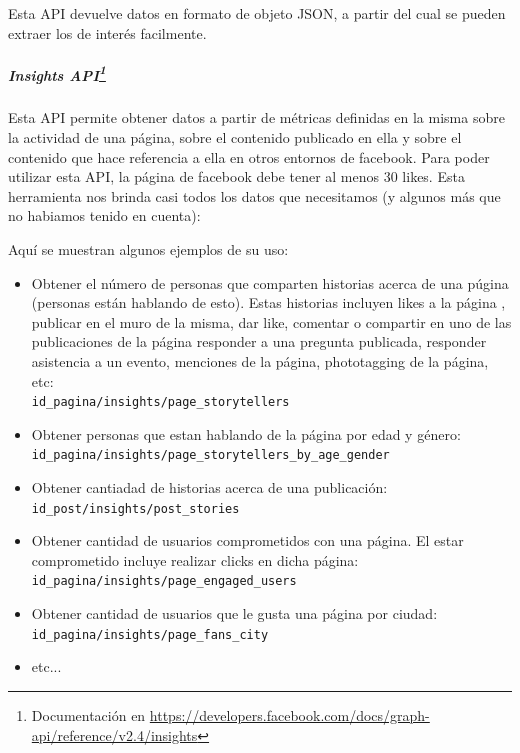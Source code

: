 \documentclass[oneside]{book}
\begin{document}
	Esta API devuelve datos en formato de objeto JSON, a partir del cual se pueden extraer los de inter\'{e}s facilmente.
	
	

	\subparagraph*{Insights API\footnote{Documentaci\'{o}n en \url{https://developers.facebook.com/docs/graph-api/reference/v2.4/insights}}}

	Esta API permite obtener datos a partir de m\'{e}tricas definidas en la misma sobre la actividad de una p\'{a}gina, sobre el contenido publicado en ella y sobre el contenido que hace referencia a ella en otros entornos de facebook.
	Para poder utilizar esta API, la p\'{a}gina de facebook debe tener al menos 30 likes.
	Esta herramienta nos brinda casi todos los datos que necesitamos (y algunos m\'{a}s que no habiamos tenido en cuenta):
	
	Aqu\'{i} se muestran algunos ejemplos de su uso:\\

	\begin{itemize}
  		\item Obtener el n\'{u}mero de personas que comparten historias acerca de una p\'{u}gina (personas están hablando de esto). Estas historias incluyen likes a la p\'{a}gina , publicar en el muro de la misma, dar like, comentar o compartir en uno de las publicaciones de la p\'{a}gina\; responder a una pregunta publicada, responder asistencia a un evento, menciones de la p\'{a}gina, phototagging de la p\'{a}gina, etc:\\ 
  		\texttt{id\_pagina/insights/page\_storytellers}

  		\item Obtener personas que estan hablando de la p\'{a}gina por edad y g\'{e}nero:\\
  		\texttt{id\_pagina/insights/page\_storytellers\_by\_age\_gender}

  		\item Obtener cantiadad de historias acerca de una publicaci\'{o}n:\\
  		\texttt{id\_post/insights/post\_stories}

  		\item Obtener cantidad de usuarios comprometidos con una p\'{a}gina. El estar comprometido incluye realizar clicks en dicha p\'{a}gina:\\
  		\texttt{id\_pagina/insights/page\_engaged\_users}

  		\item Obtener cantidad de usuarios que le gusta una p\'{a}gina por ciudad:\\
  		\texttt{id\_pagina/insights/page\_fans\_city}

  		\item etc...
	\end{itemize}
	
\end{document}
